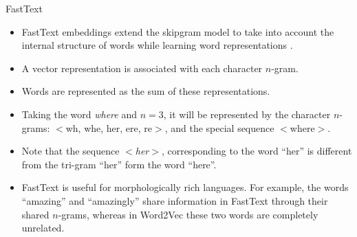 \documentclass[handout]{beamer}
\begin{document}
\begin{frame}{FastText}
\begin{scriptsize}
\begin{itemize}
  
\item FastText embeddings extend the skipgram model to take into account the internal structure of words while learning word representations \cite{bojanowski2016enriching}.

\item A vector representation is associated with each character $n$-gram.

\item  Words are represented as the sum of these representations. 

\item Taking the word \emph{where} and $n = 3$, it will be represented by the character $n$-grams: $<$wh, whe, her, ere, re$>$, and the special sequence $<$where$>$.

\item Note that the sequence \emph{$<$her$>$}, corresponding to the word ``her'' is different from the tri-gram ``her'' form the word ``here''. 

\item FastText is useful for morphologically rich languages. For example, the words ``amazing'' and ``amazingly'' share information in FastText through their shared $n$-grams, whereas in Word2Vec these two words are completely unrelated.    
   
\end{itemize}
\end{scriptsize}
\end{frame}
\end{document}
